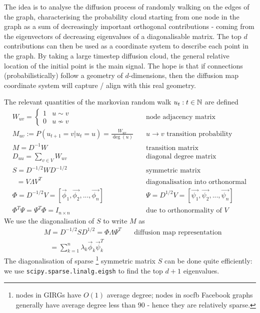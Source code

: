 The idea is to analyse the diffusion process of randomly walking on the edges of the graph, characterising the probability cloud starting from one node in the graph as a sum of decreasingly important orthogonal contributions - coming from the eigenvectors of decreasing eigenvalues of a diagonalisable matrix.
The top $d$ contributions can then be used as a coordinate system to describe each point in the graph. By taking a large timestep diffusion cloud, the general relative location of the initial point is the main signal. The hope is that if connections (probabilistically) follow a geometry of $d$-dimensions, then the diffusion map coordinate system will capture / align with this real geometry.

The relevant quantities of the markovian random walk $u_t : t \in \mathbb{N}$ are defined
\begin{align*}
  & W_{uv} = \begin{cases}1 & u \sim v \\0 & u \nsim v \end{cases} \quad & \text{node adjacency matrix}
  \\
  & M_{uv} := P(u_{t+1} = v | u_t=u) = \frac{W_{uv}}{\deg(u)}
  \quad & \text{$u \to v$ transition probability}
  \\
  & M = D^{-1}W \quad & \text{transition matrix}\\
  & D_{uu} = \sum_{v\in V} W_{uv} \quad & \text{diagonal degree matrix}\\
  & S = D^{-1/2} W D^{-1/2} \quad & \text{symmetric matrix}\\
  & \;\; = V \Lambda V^T \quad & \text{diagonalisation into orthonormal e-vectors}\\
  & \Phi = D^{-1/2} V = [\vec{\phi}_1, \vec{\phi_2}, ..., \vec{\phi_n}] \quad & \Psi = D^{1/2} V = [\vec{\psi_1}, \vec{\psi_2}, ..., \vec{\psi_n}]\\
  & \Phi^T \Psi = \Psi^T \Phi = I_{n \times n} \quad & \text{due to orthonormality of $V$}
\end{align*}
%
We use the diagonalisation of $S$ to write $M$ as 
\begin{align*}
  & M = D^{-1/2} S D^{1/2} = \Phi \Lambda \Psi^T \quad & \text{diffusion map representation}\\
  & \;\;\; = \sum_{k=1}^n \lambda_k \vec{\phi}_k \vec{\psi}_k^T &
\end{align*}
%
The diagonalisation of sparse
\footnote{nodes in GIRGs have $O(1)$ average degree; nodes in socfb Facebook graphs generally have average degree less than $90$ - hence they are relatively sparse.}
symmetric matrix $S$ can be done quite efficiently: 
we use \verb+scipy.sparse.linalg.eigsh+ to find the top $d+1$ eigenvalues.

